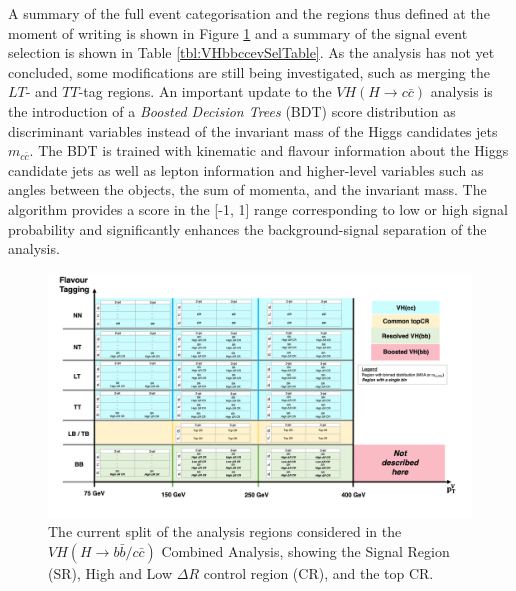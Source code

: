 A summary of the full event categorisation and the regions thus defined at the moment of writing is shown in Figure \ref{fig:ana-strat-det} and a summary of the signal event selection is shown in Table \ref{tbl:VHbbccevSelTable}. As the analysis has not yet concluded, some modifications are still being investigated, such as merging the $LT$- and $TT$-tag regions. An important update to the $VH (H\rightarrow c\bar{c})$ analysis is the introduction of a \textit{Boosted Decision Trees} (BDT) score distribution as discriminant variables instead of the invariant mass of the Higgs candidates jets $m_{c\bar{c}}$. The BDT is trained with kinematic and flavour information about the Higgs candidate jets as well as lepton information and higher-level variables such as angles between the objects, the sum of momenta, and the invariant mass. The algorithm provides a score in the [-1, 1] range corresponding to low or high signal probability and significantly enhances the background-signal separation of the analysis.

\begin{figure}[h!]
\hspace{-2.0cm}
\includegraphics[scale=0.625]{Images/VH/VH_analysis_cat.png}
\caption{The current split of the analysis regions considered in the $VH (H\rightarrow b\bar{b}/c\bar{c})$ Combined Analysis, showing the Signal Region (SR), High and Low $\Delta R$ control region (CR), and the top CR. } 
\label{fig:ana-strat-det}
\end{figure}

